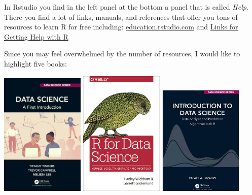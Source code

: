 \documentclass[
  12pt,
  oneside]{book}
\theoremstyle{definition}
\theoremstyle{definition}
\theoremstyle{definition}
\theoremstyle{definition}
\theoremstyle{remark}
\begin{document}
In Rstudio you find in the left panel at the bottom a panel that is called \emph{Help}. There you find a lot of links, manuals, and references that offer you tons of resources to learn R for free including:
\href{https://education.rstudio.com/}{education.rstudio.com}
and \href{https://support.rstudio.com/hc/en-us/articles/200552336-Getting-Help-with-R}{Links for Getting Help with R}

Since you may feel overwhelmed by the number of resources, I would like to highlight five books:

\includegraphics[width=0.3\textwidth,height=\textheight]{fig/ds-a-first-intro-cover.jpg}
\includegraphics[width=0.3\textwidth,height=\textheight]{fig/rfordatas.png}
\includegraphics[width=0.3\textwidth,height=\textheight]{fig/irizarrybook.png}
\end{document}
